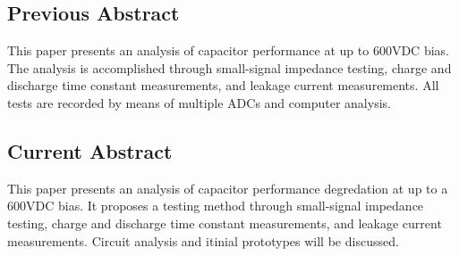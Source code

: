 \subsection{Previous Abstract}
This paper presents an analysis of capacitor performance at up to 600VDC bias. The analysis is accomplished through small-signal impedance testing, charge and discharge time constant measurements, and leakage current measurements. All tests are recorded by means of multiple ADCs and computer analysis.

\subsection{Current Abstract}
This paper presents an analysis of capacitor performance degredation at up to a 600VDC bias. It proposes a testing method through small-signal impedance testing, charge and discharge time constant measurements, and leakage current measurements. Circuit analysis and itinial prototypes will be discussed.

